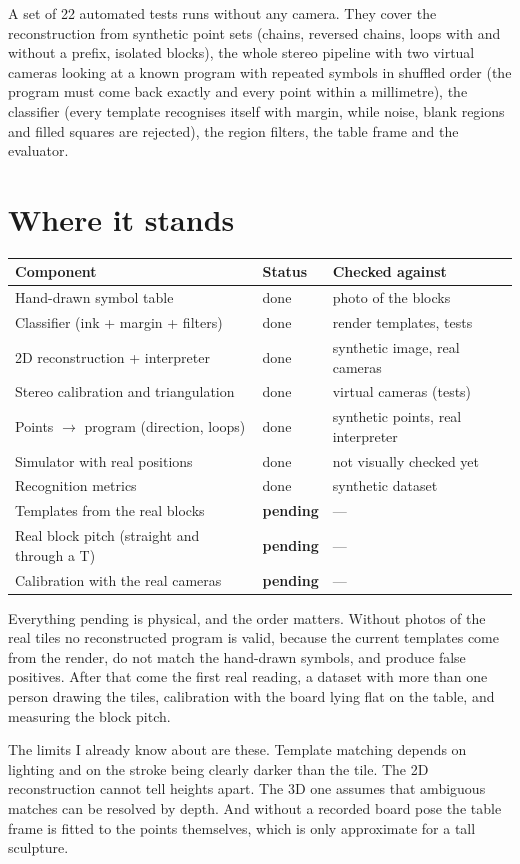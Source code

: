 \documentclass[11pt,a4paper]{article}
\begin{document}
A set of 22 automated tests runs without any camera. They cover the reconstruction from synthetic point sets (chains, reversed chains, loops with and without a prefix, isolated blocks), the whole stereo pipeline with two virtual cameras looking at a known program with repeated symbols in shuffled order (the program must come back exactly and every point within a millimetre), the classifier (every template recognises itself with margin, while noise, blank regions and filled squares are rejected), the region filters, the table frame and the evaluator.

\section{Where it stands}

\begin{center}
\begin{tabular}{@{}lll@{}}
\toprule
Component & Status & Checked against \\
\midrule
Hand-drawn symbol table & done & photo of the blocks \\
Classifier (ink + margin + filters) & done & render templates, tests \\
2D reconstruction + interpreter & done & synthetic image, real cameras \\
Stereo calibration and triangulation & done & virtual cameras (tests) \\
Points $\to$ program (direction, loops) & done & synthetic points, real interpreter \\
Simulator with real positions & done & not visually checked yet \\
Recognition metrics & done & synthetic dataset \\
Templates from the real blocks & \textbf{pending} & --- \\
Real block pitch (straight and through a T) & \textbf{pending} & --- \\
Calibration with the real cameras & \textbf{pending} & --- \\
\bottomrule
\end{tabular}
\end{center}

Everything pending is physical, and the order matters. Without photos of the real tiles no reconstructed program is valid, because the current templates come from the render, do not match the hand-drawn symbols, and produce false positives. After that come the first real reading, a dataset with more than one person drawing the tiles, calibration with the board lying flat on the table, and measuring the block pitch.

The limits I already know about are these. Template matching depends on lighting and on the stroke being clearly darker than the tile. The 2D reconstruction cannot tell heights apart. The 3D one assumes that ambiguous matches can be resolved by depth. And without a recorded board pose the table frame is fitted to the points themselves, which is only approximate for a tall sculpture.
\end{document}
